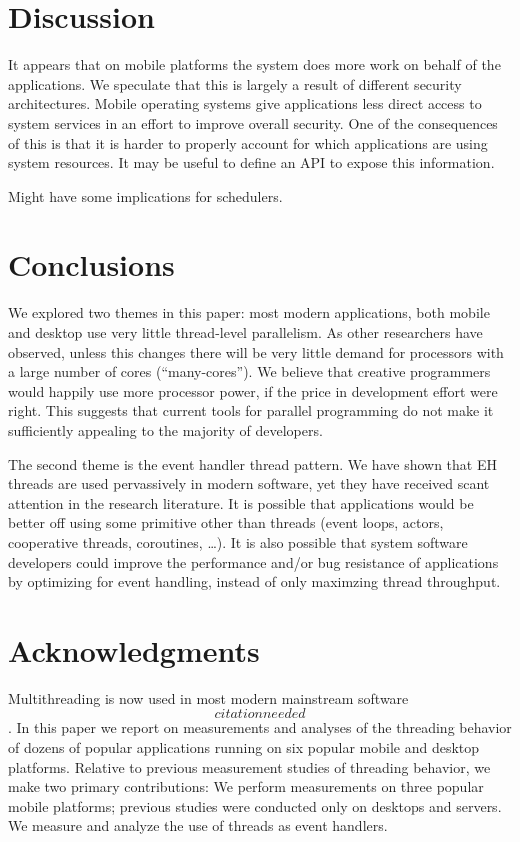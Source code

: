 \documentclass[11pt]{sigplanconf}
\begin{document}
\section{Discussion}

It appears that on mobile platforms the system does more work on behalf
of the applications.  We speculate that this is largely a result of
different security architectures.  Mobile operating systems give
applications less direct access to system services in an effort to
improve overall security.  One of the consequences of this is that it is
harder to properly account for which applications are using system
resources.  It may be useful to define an API to expose this
information.

Might have some implications for schedulers.

\section{Conclusions}

We explored two themes in this paper: most modern applications, both
mobile and desktop use very little thread-level parallelism.  As other
researchers have observed, unless this changes there will be very little
demand for processors with a large number of cores (``many-cores'').  We
believe that creative programmers would happily use more processor
power, if the price in development effort were right.  This suggests
that current tools for parallel programming do not make it sufficiently
appealing to the majority of developers.

The second theme is the event handler thread pattern.  We have shown
that EH threads are used pervassively in modern software, yet they have
received scant attention in the research literature.  It is possible
that applications would be better off using some primitive other than
threads (event loops, actors, cooperative threads, coroutines, \ldots).
It is also possible that system software developers could improve the
performance and/or bug resistance of applications by optimizing for
event handling, instead of only maximzing thread throughput.

\section{Acknowledgments}


Multithreading is now used in most modern mainstream software \[citation
needed\].  In this paper we report on measurements and analyses of the
threading behavior of dozens of popular applications running on six
popular mobile and desktop platforms.  Relative to previous measurement
studies of threading behavior, we make two primary contributions: We
perform measurements on three popular mobile platforms; previous studies
were conducted only on desktops and servers.  We measure and analyze the
use of threads as event handlers.
\end{document}
